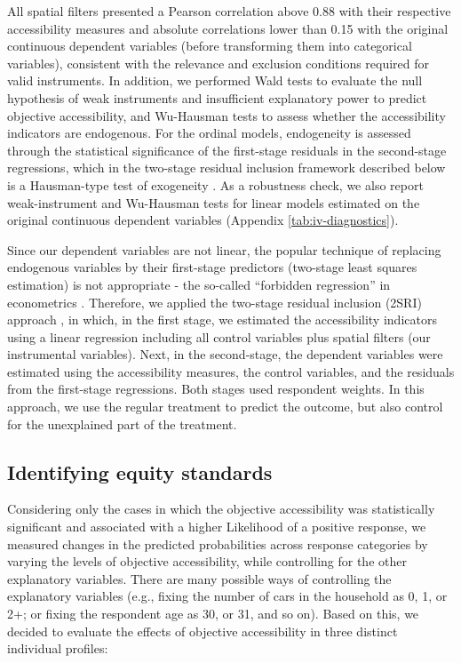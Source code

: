 \documentclass[preprint, 3p,
authoryear]{elsarticle} %
\begin{document}
All spatial filters presented a Pearson correlation above 0.88 with
their respective accessibility measures and absolute correlations lower
than 0.15 with the original continuous dependent variables (before
transforming them into categorical variables), consistent with the
relevance and exclusion conditions required for valid instruments. In
addition, we performed Wald tests to evaluate the null hypothesis of
weak instruments and insufficient explanatory power to predict objective
accessibility, and Wu-Hausman tests to assess whether the accessibility
indicators are endogenous. For the ordinal models, endogeneity is
assessed through the statistical significance of the first-stage
residuals in the second-stage regressions, which in the two-stage
residual inclusion framework described below is a Hausman-type test of
exogeneity \citep{terza2008, wooldridge2010}. As a robustness check, we
also report weak-instrument and Wu-Hausman tests for linear models
estimated on the original continuous dependent variables (Appendix
\ref{tab:iv-diagnostics}).

Since our dependent variables are not linear, the popular technique of
replacing endogenous variables by their first-stage predictors
(two-stage least squares estimation) is not appropriate - the so-called
``forbidden regression'' in econometrics
\citep{wooldridge2010, cunningham2021causal, huntington-klein2021}.
Therefore, we applied the two-stage residual inclusion (2SRI) approach
\citep{terza2008}, in which, in the first stage, we estimated the
accessibility indicators using a linear regression including all control
variables plus spatial filters (our instrumental variables). Next, in
the second-stage, the dependent variables were estimated using the
accessibility measures, the control variables, and the residuals from
the first-stage regressions. Both stages used respondent weights. In
this approach, we use the regular treatment to predict the outcome, but
also control for the unexplained part of the treatment.

\subsection{Identifying equity
standards}\label{identifying-equity-standards}

Considering only the cases in which the objective accessibility was
statistically significant and associated with a higher Likelihood of a
positive response, we measured changes in the predicted probabilities
across response categories by varying the levels of objective
accessibility, while controlling for the other explanatory variables.
There are many possible ways of controlling the explanatory variables
(e.g., fixing the number of cars in the household as 0, 1, or 2+; or
fixing the respondent age as 30, or 31, and so on). Based on this, we
decided to evaluate the effects of objective accessibility in three
distinct individual profiles:
\end{document}
